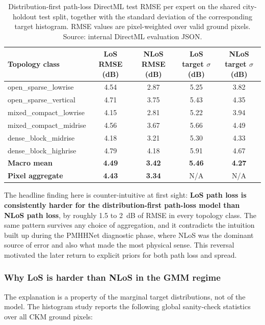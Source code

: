 \begin{table}[H]
\centering
\caption[Distribution-first path-loss RMSE per expert.]%
{Distribution-first path-loss DirectML test RMSE per expert on the shared
city-holdout test split, together with the standard deviation of the
corresponding target histogram. RMSE values are pixel-weighted over
valid ground pixels. Source: internal DirectML evaluation JSON.}
\label{tab:try76_per_expert}
\scriptsize
\begin{tabular}{lcccc}
\toprule
Topology class & LoS RMSE (dB) & NLoS RMSE (dB) & LoS target $\sigma$ (dB) & NLoS target $\sigma$ (dB) \\
\midrule
open\_sparse\_lowrise   & 4.54 & 2.87 & 5.25 & 3.82 \\
open\_sparse\_vertical  & 4.71 & 3.75 & 5.43 & 4.35 \\
mixed\_compact\_lowrise & 4.15 & 2.81 & 5.22 & 3.94 \\
mixed\_compact\_midrise & 4.56 & 3.67 & 5.66 & 4.49 \\
dense\_block\_midrise   & 4.18 & 3.21 & 5.30 & 4.33 \\
dense\_block\_highrise  & 4.79 & 4.18 & 5.91 & 4.67 \\
\midrule
\textbf{Macro mean}     & \textbf{4.49} & \textbf{3.42} & \textbf{5.46} & \textbf{4.27} \\
\textbf{Pixel aggregate}& \textbf{4.43} & \textbf{3.34} & N/A & N/A \\
\bottomrule
\end{tabular}
\end{table}

The headline finding here is counter-intuitive at first sight:
\textbf{LoS path loss is consistently harder for the distribution-first path-loss model than NLoS path
loss}, by roughly \SI{1.5}{} to \SI{2}{dB} of RMSE in every topology
class. The same pattern survives any choice of aggregation, and it
contradicts the intuition built up during the PMHHNet diagnostic phase, where NLoS was
the dominant source of error and also what made the most physical sense.
This reversal motivated the later return to explicit priors for both path loss
and spread.

\subsubsection*{Why LoS is harder than NLoS in the GMM regime}

The explanation is a property of the marginal target distributions, not
of the model. The histogram study reports the following global
sanity-check statistics over all CKM ground pixels:

